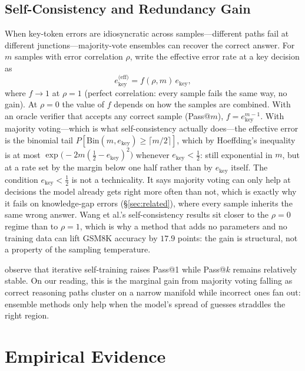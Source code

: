 \subsection{Self-Consistency and Redundancy Gain}

When key-token errors are idiosyncratic across samples---different paths fail at different junctions---majority-vote ensembles can recover the correct answer. For $m$ samples with error correlation $\rho$, write the effective error rate at a key decision as
\begin{equation}
\label{eq:ensemble}
e_{\text{key}}^{\text{(eff)}} = f(\rho, m)\, e_{\text{key}},
\end{equation}
where $f \to 1$ at $\rho = 1$ (perfect correlation: every sample fails the same way, no gain). At $\rho = 0$ the value of $f$ depends on how the samples are combined. With an oracle verifier that accepts any correct sample (Pass@$m$), $f = e_{\text{key}}^{m-1}$. With majority voting---which is what self-consistency actually does---the effective error is the binomial tail $P[\mathrm{Bin}(m, e_{\text{key}}) \ge \lceil m/2 \rceil]$, which by Hoeffding's inequality is at most $\exp\!\big(-2m(\tfrac12 - e_{\text{key}})^2\big)$ whenever $e_{\text{key}} < \tfrac12$: still exponential in $m$, but at a rate set by the margin below one half rather than by $e_{\text{key}}$ itself. The condition $e_{\text{key}} < \tfrac12$ is not a technicality. It says majority voting can only help at decisions the model already gets right more often than not, which is exactly why it fails on knowledge-gap errors (\S\ref{sec:related}), where every sample inherits the same wrong answer. Wang et al.'s self-consistency results \citep{wang2023self} sit closer to the $\rho = 0$ regime than to $\rho = 1$, which is why a method that adds no parameters and no training data can lift GSM8K accuracy by $17.9$ points: the gain is structural, not a property of the sampling temperature.

\citet{costello2025think} observe that iterative self-training raises Pass@1 while Pass@$k$ remains relatively stable. On our reading, this is the marginal gain from majority voting falling as correct reasoning paths cluster on a narrow manifold while incorrect ones fan out: ensemble methods only help when the model's spread of guesses straddles the right region.

\section{Empirical Evidence}
\label{sec:evidence}

